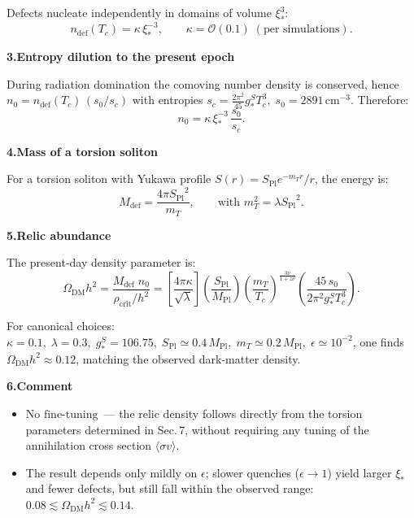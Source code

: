 \documentclass{article}
\newcommand{\Splanck}{\ensuremath{S_{\mathrm{Pl}}}}
\begin{document}
Defects nucleate independently in domains of volume \(\xi_*^3\):
\begin{equation}
n_{\text{def}}(T_c)=\kappa\,\xi_*^{-3},
\qquad
\kappa=\mathcal{O}(0.1)\;(\text{per simulations}).
\end{equation}

\vspace{0.6em}
\noindent\textbf{3.\;Entropy dilution to the present epoch}

During radiation domination the comoving number density is conserved, hence  
\(n_0 = n_{\text{def}}(T_c)\,(s_0/s_c)\) with entropies  
\(s_c=\tfrac{2\pi^2}{45}g_*^S T_c^{3},\; s_0=2891\,\text{cm}^{-3}\).
Therefore:
\begin{equation}
n_0 = \kappa\,\xi_*^{-3}\,
\frac{s_0}{s_c}.
\end{equation}

\vspace{0.6em}
\noindent\textbf{4.\;Mass of a torsion soliton}

For a torsion soliton with Yukawa profile  
\(S(r)=\Splanck e^{-m_T r}/r\), the energy is:
\begin{equation}
M_{\text{def}} = \frac{4\pi \Splanck^2}{m_T},
\qquad \text{with } m_T^2 = \lambda \Splanck^2.
\end{equation}

\vspace{0.6em}
\noindent\textbf{5.\;Relic abundance}

The present‐day density parameter is:
\begin{equation}
\Omega_{\text{DM}}h^{2}=
\frac{M_{\text{def}}\;n_0}{\rho_{\text{crit}}/h^{2}}
=
\left[\frac{4\pi\kappa}{\sqrt{\lambda}}\right]
\left(\frac{\Splanck}{M_{\text{Pl}}}\right)
\left(\frac{m_T}{T_c}\right)^{\!\frac{3\nu}{1+z\nu}}
\left(\frac{45\,s_0}{2\pi^{2}g_*^{S}T_c^{3}}\right).
\end{equation}

For canonical choices:  
\(\kappa\!=\!0.1,\; \lambda\!=\!0.3,\;
g_*^{S}\!=\!106.75,\;
\Splanck\simeq0.4\,M_{\text{Pl}},\;
m_T\simeq0.2\,M_{\text{Pl}},\;
\epsilon\simeq10^{-2}\),  
one finds  
\(\Omega_{\text{DM}}h^{2}\approx0.12\),
matching the observed dark‑matter density.

\vspace{0.6em}
\noindent\textbf{6.\;Comment}

\begin{itemize}
\item \(\boxed{\text{No fine‑tuning}}\) — the relic density follows directly from
    the torsion parameters determined in Sec.\,7, without requiring any tuning
    of the annihilation cross section \(\langle\sigma v\rangle\).
\item The result depends only mildly on \(\epsilon\); slower quenches
    (\(\epsilon\!\rightarrow\!1\)) yield larger \(\xi_*\) and fewer
    defects, but still fall within the observed range:
    \(0.08\lesssim\Omega_{\text{DM}}h^{2}\lesssim0.14\).
\end{itemize}
\end{document}
